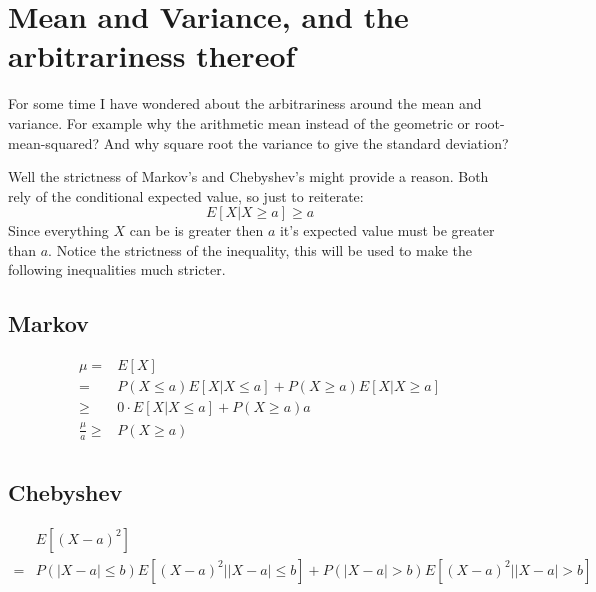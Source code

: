 
\section{Mean and Variance, and the arbitrariness thereof}
For some time I have wondered about the arbitrariness around the mean and variance.
For example why the arithmetic mean instead of the geometric or root-mean-squared?
And why square root the variance to give the standard deviation?

Well the strictness of Markov's and Chebyshev's might provide a reason.
Both rely of the conditional expected value, so just to reiterate:
\[E[X | X \geq a] \geq a \]
Since everything $X$ can be is greater then $a$ it's expected value must be greater than $a$. 
Notice the strictness of the inequality, this will be used to make the following inequalities much stricter.

\subsection*{Markov}
\begin{equation*}
\begin{aligned}
	\mu =& E[X]\\
	=& P(X \leq a)E[X|X \leq a] + P(X \geq a)E[X|X \geq a] \\ 
	\geq& 0\cdot E[X|X \leq a] + P(X \geq a)a \\ 
	\frac{\mu}{a}\geq& P(X \geq a) \\
\end{aligned}
\end{equation*}

\subsection*{Chebyshev}
\begin{equation*}
\begin{aligned}
	& E[(X-a)^2] \\
	=&P(|X-a| \leq b)E[(X-a)^2 | |X-a| \leq b] + P(|X-a| > b)E[(X-a)^2 | |X-a| > b]\\
\end{aligned}
\end{equation*}

